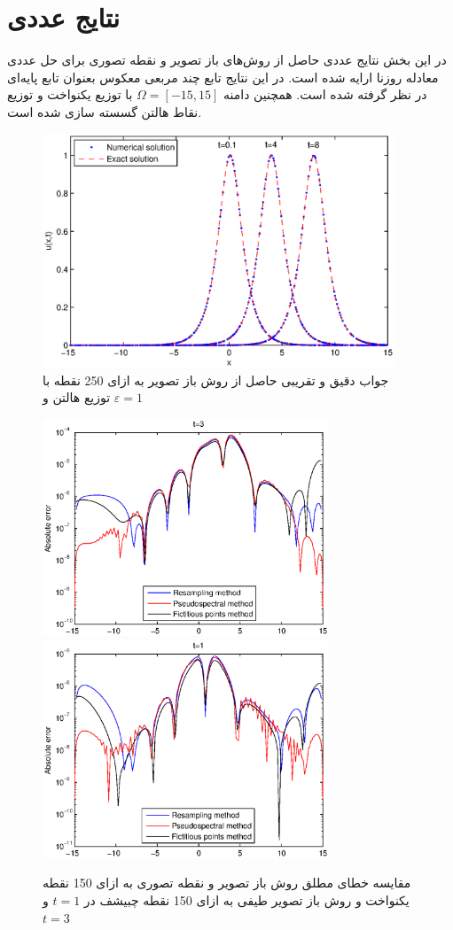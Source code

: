 \section{نتایج عددی}

در این بخش نتایج عددی حاصل از روش‌های باز تصویر و نقطه تصوری برای حل عددی معادله روزنا ارایه شده است. در این نتایج تابع چند مربعی معکوس بعنوان تابع پایه‌ای در نظر گرفته شده است. همچنین دامنه
$\Omega=[-15,15]$
با توزیع یکنواخت و توزیع نقاط هالتن گسسته سازی شده است.
%
\begin{figure}
	\centerline{
		\includegraphics[height=7cm]{figure21.eps}} \caption{
		جواب دقیق و تقریبی حاصل از روش باز تصویر به ازای 250 نقطه با توزیع هالتن و 
		$\varepsilon=1$ } 
	\label{fig:randpo}
\end{figure}
%
%
\begin{figure}
	\centerline{
		\includegraphics[height=6.5cm]{figure22.eps}
		\includegraphics[height=6.5cm]{figure23.eps}} \caption{
		مقایسه خطای مطلق روش باز تصویر و نقطه تصوری به ازای 150 نقطه یکنواخت و روش باز تصویر طیفی به ازای 150 نقطه چبیشف در 
		$t=1$
		و
		$t=3$} \label{fig:absolute}
\end{figure}
